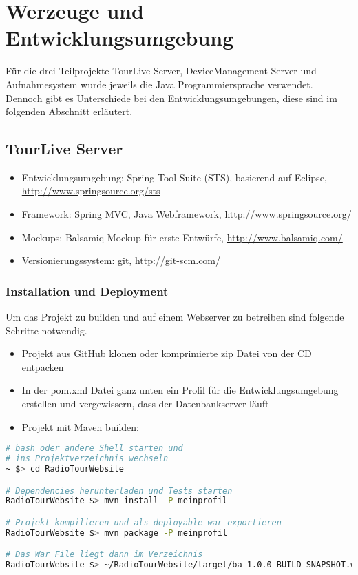 \section{Werzeuge und Entwicklungsumgebung}
\label{sec:wekzeugeundentwicklungsumgebung}
Für die drei Teilprojekte TourLive Server, DeviceManagement Server und Aufnahmesystem wurde jeweils die Java Programmiersprache verwendet. Dennoch gibt es Unterschiede bei den Entwicklungsumgebungen, diese sind im folgenden Abschnitt erläutert.

\subsection{TourLive Server}
\begin{itemize}
\item Entwicklungsumgebung: Spring Tool Suite (STS), basierend auf Eclipse, \url{http://www.springsource.org/sts}
\item Framework: Spring MVC, Java Webframework, \url{http://www.springsource.org/}
\item Mockups: Balsamiq Mockup für erste Entwürfe, \url{http://www.balsamiq.com/}
\item Versionierungssystem: git, \url{http://git-scm.com/}
\end{itemize}

\subsubsection{Installation und Deployment}
Um das Projekt zu builden und auf einem Webserver zu betreiben sind folgende Schritte notwendig.

\begin{itemize}
\item Projekt aus GitHub klonen oder komprimierte zip Datei von der CD entpacken
\item In der pom.xml Datei ganz unten ein Profil für die Entwicklungsumgebung erstellen und vergewissern, dass der Datenbankserver läuft
\item Projekt mit Maven builden:
\end{itemize}

\begin{lstlisting}[language=Bash, caption=Build und Test mit Maven]
# bash oder andere Shell starten und
# ins Projektverzeichnis wechseln
~ $> cd RadioTourWebsite

# Dependencies herunterladen und Tests starten
RadioTourWebsite $> mvn install -P meinprofil

# Projekt kompilieren und als deployable war exportieren
RadioTourWebsite $> mvn package -P meinprofil

# Das War File liegt dann im Verzeichnis
RadioTourWebsite $> ~/RadioTourWebsite/target/ba-1.0.0-BUILD-SNAPSHOT.war

\end{lstlisting}

